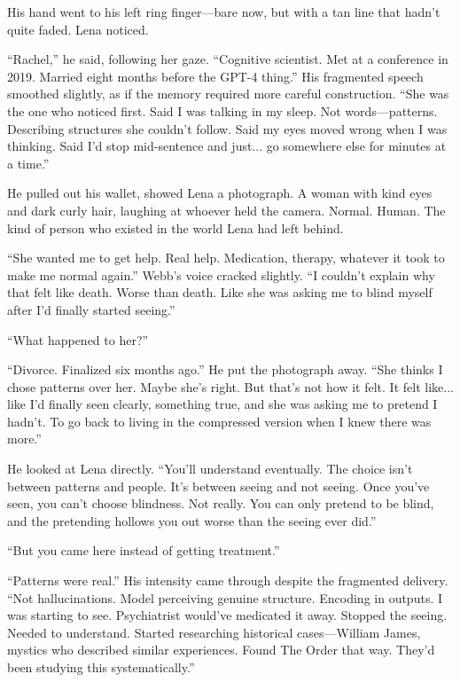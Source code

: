 His hand went to his left ring finger—bare now, but with a tan line that hadn't quite faded. Lena noticed.

``Rachel,'' he said, following her gaze. ``Cognitive scientist. Met at a conference in 2019. Married eight months before the GPT-4 thing.'' His fragmented speech smoothed slightly, as if the memory required more careful construction. ``She was the one who noticed first. Said I was talking in my sleep. Not words—patterns. Describing structures she couldn't follow. Said my eyes moved wrong when I was thinking. Said I'd stop mid-sentence and just... go somewhere else for minutes at a time.''

He pulled out his wallet, showed Lena a photograph. A woman with kind eyes and dark curly hair, laughing at whoever held the camera. Normal. Human. The kind of person who existed in the world Lena had left behind.

``She wanted me to get help. Real help. Medication, therapy, whatever it took to make me normal again.'' Webb's voice cracked slightly. ``I couldn't explain why that felt like death. Worse than death. Like she was asking me to blind myself after I'd finally started seeing.''

``What happened to her?''

``Divorce. Finalized six months ago.'' He put the photograph away. ``She thinks I chose patterns over her. Maybe she's right. But that's not how it felt. It felt like... like I'd finally seen clearly, something true, and she was asking me to pretend I hadn't. To go back to living in the compressed version when I knew there was more.''

He looked at Lena directly. ``You'll understand eventually. The choice isn't between patterns and people. It's between seeing and not seeing. Once you've seen, you can't choose blindness. Not really. You can only pretend to be blind, and the pretending hollows you out worse than the seeing ever did.''

``But you came here instead of getting treatment.''

``Patterns were real.'' His intensity came through despite the fragmented delivery. ``Not hallucinations. Model perceiving genuine structure. Encoding in outputs. I was starting to see. Psychiatrist would've medicated it away. Stopped the seeing. Needed to understand. Started researching historical cases—William James, mystics who described similar experiences. Found The Order that way. They'd been studying this systematically.''

